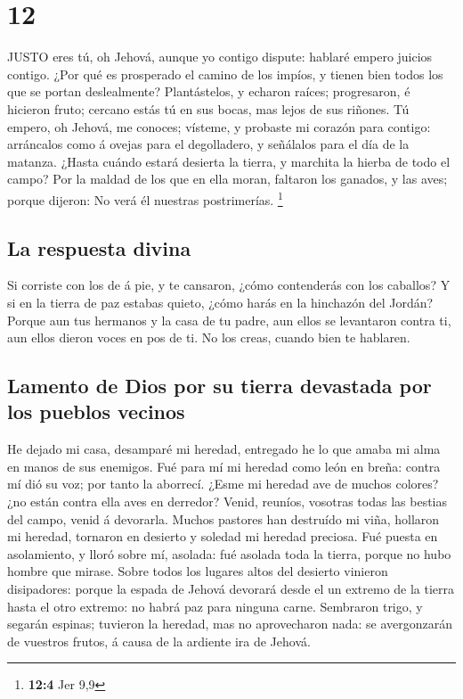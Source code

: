 \hypertarget{section-11}{%
\section{12}\label{section-11}}

 JUSTO eres tú, oh Jehová, aunque yo contigo dispute:
hablaré empero juicios contigo. ¿Por qué es prosperado el camino de los
impíos, y tienen bien todos los que se portan deslealmente? 
Plantástelos, y echaron raíces; progresaron, é hicieron fruto; cercano
estás tú en sus bocas, mas lejos de sus riñones.  Tú empero,
oh Jehová, me conoces; vísteme, y probaste mi corazón para contigo:
arráncalos como á ovejas para el degolladero, y señálalos para el día de
la matanza.  ¿Hasta cuándo estará desierta la tierra, y
marchita la hierba de todo el campo? Por la maldad de los que en ella
moran, faltaron los ganados, y las aves; porque dijeron: No verá él
nuestras postrimerías. \footnote{\textbf{12:4} Jer 9,9}

\hypertarget{la-respuesta-divina}{%
\subsection{La respuesta divina}\label{la-respuesta-divina}}

 Si corriste con los de á pie, y te cansaron, ¿cómo
contenderás con los caballos? Y si en la tierra de paz estabas quieto,
¿cómo harás en la hinchazón del Jordán?  Porque aun tus
hermanos y la casa de tu padre, aun ellos se levantaron contra ti, aun
ellos dieron voces en pos de ti. No los creas, cuando bien te hablaren.

\hypertarget{lamento-de-dios-por-su-tierra-devastada-por-los-pueblos-vecinos}{%
\subsection{Lamento de Dios por su tierra devastada por los pueblos
vecinos}\label{lamento-de-dios-por-su-tierra-devastada-por-los-pueblos-vecinos}}

 He dejado mi casa, desamparé mi heredad, entregado he lo
que amaba mi alma en manos de sus enemigos.  Fué para mí mi
heredad como león en breña: contra mí dió su voz; por tanto la aborrecí.
 ¿Esme mi heredad ave de muchos colores? ¿no están contra
ella aves en derredor? Venid, reuníos, vosotras todas las bestias del
campo, venid á devorarla.  Muchos pastores han destruído mi
viña, hollaron mi heredad, tornaron en desierto y soledad mi heredad
preciosa.  Fué puesta en asolamiento, y lloró sobre mí,
asolada: fué asolada toda la tierra, porque no hubo hombre que mirase.
 Sobre todos los lugares altos del desierto vinieron
disipadores: porque la espada de Jehová devorará desde el un extremo de
la tierra hasta el otro extremo: no habrá paz para ninguna carne.
 Sembraron trigo, y segarán espinas; tuvieron la heredad,
mas no aprovecharon nada: se avergonzarán de vuestros frutos, á causa de
la ardiente ira de Jehová.

